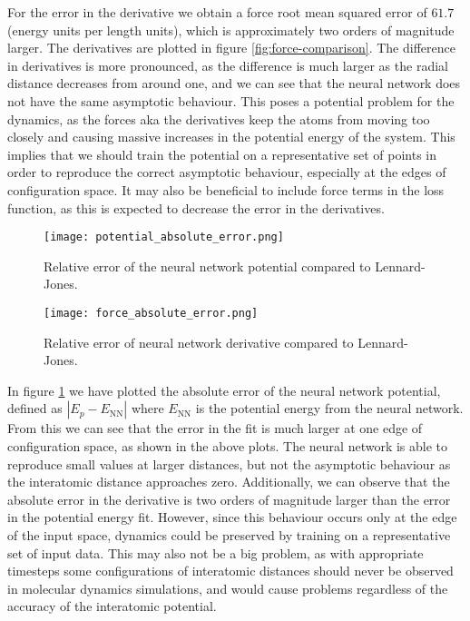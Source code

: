 For the error in the derivative we obtain a force root mean squared error
of $61.7$ (energy units per length units), which is approximately two orders
of magnitude larger. The derivatives are plotted in figure
\ref{fig:force-comparison}.
The difference in derivatives is more pronounced, as the
difference is much larger as the radial distance decreases from
around one, and we can see that the neural network does not
have the same asymptotic behaviour. This poses a potential problem
for the dynamics, as the forces aka the derivatives keep
the atoms from moving too closely and causing massive
increases in the potential energy of the system.
This implies that we should train the potential on a representative
set of points in order to reproduce the correct asymptotic behaviour,
especially at the edges of configuration space.
It may also be beneficial to include force terms in the loss function,
as this is expected to decrease the error in the derivatives.

\begin{figure}[h]
    \centering
    \texttt{[image: potential\_absolute\_error.png]}
    \caption{Relative error of the neural network potential compared
        to Lennard-Jones.}
    \label{fig:potential-rel-error}
\end{figure}

\begin{figure}[h]
    \centering
    \texttt{[image: force\_absolute\_error.png]}
    \caption{Relative error of neural network derivative compared
        to Lennard-Jones.}
    \label{fig:force-rel-error}
\end{figure}

In figure \ref{fig:potential-rel-error} we have plotted
the absolute error of the neural network potential, defined
as $\left| E_p - E_{\text{NN}}\right|$
where $E_{\text{NN}}$ is the potential energy from the neural network.
From this we can see that the error in the fit is much larger
at one edge of configuration space, as shown in the above plots.
The neural network is able to reproduce small values
at larger distances, but not the asymptotic behaviour
as the interatomic distance approaches zero.
Additionally, we can observe that the absolute error in the derivative
is two orders of magnitude larger than the error in the potential energy fit.
However, since
this behaviour occurs only at the edge of the input space,
dynamics could be preserved by training on a representative set
of input data. This may also not be a big problem, as
with appropriate timesteps some configurations of interatomic distances
should never be observed in molecular dynamics simulations,
and would cause problems regardless of the accuracy of the
interatomic potential.
